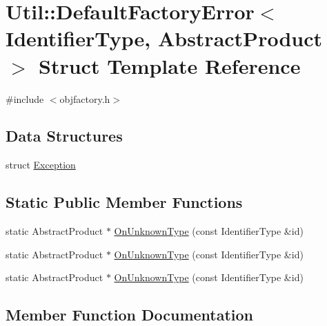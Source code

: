 \hypertarget{structUtil_1_1DefaultFactoryError}{}\section{Util\+:\+:Default\+Factory\+Error$<$ Identifier\+Type, Abstract\+Product $>$ Struct Template Reference}
\label{structUtil_1_1DefaultFactoryError}


{\ttfamily \#include $<$objfactory.\+h$>$}

\subsection*{Data Structures}
\begin{DoxyCompactItemize}
\item 
struct \mbox{\hyperlink{structUtil_1_1DefaultFactoryError_1_1Exception}{Exception}}
\end{DoxyCompactItemize}
\subsection*{Static Public Member Functions}
\begin{DoxyCompactItemize}
\item 
static Abstract\+Product $\ast$ \mbox{\hyperlink{structUtil_1_1DefaultFactoryError_a09811b515633321285301106058d1560}{On\+Unknown\+Type}} (const Identifier\+Type \&id)
\item 
static Abstract\+Product $\ast$ \mbox{\hyperlink{structUtil_1_1DefaultFactoryError_a09811b515633321285301106058d1560}{On\+Unknown\+Type}} (const Identifier\+Type \&id)
\item 
static Abstract\+Product $\ast$ \mbox{\hyperlink{structUtil_1_1DefaultFactoryError_a09811b515633321285301106058d1560}{On\+Unknown\+Type}} (const Identifier\+Type \&id)
\end{DoxyCompactItemize}


\subsection{Member Function Documentation}
\mbox{\label{structUtil_1_1DefaultFactoryError_a09811b515633321285301106058d1560}} 
